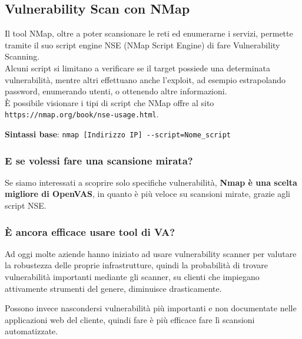 \documentclass{article}
\begin{document}
\subsection{Vulnerability Scan con NMap}
Il tool NMap, oltre a poter scansionare le reti ed enumerarne i servizi, permette tramite il suo script engine NSE (NMap Script Engine) di fare Vulnerability Scanning.\\
Alcuni script si limitano a verificare se il target possiede una determinata vulnerabilità, mentre altri effettuano anche l’exploit, ad esempio estrapolando password, enumerando utenti, o ottenendo altre informazioni.\\ È possibile visionare i tipi di script che NMap offre al sito \verb|https://nmap.org/book/nse-usage.html|.

\textbf{Sintassi base}: \verb|nmap [Indirizzo IP] --script=Nome_script| 

\subsubsection{E se volessi fare una scansione mirata?}
Se siamo interessati a scoprire solo specifiche vulnerabilità, \textbf{Nmap è una scelta migliore di OpenVAS}, in quanto è più veloce su scansioni mirate, grazie agli script NSE.

\subsubsection{È ancora efficace usare tool di VA?}
Ad oggi molte aziende hanno iniziato ad usare vulnerability scanner per valutare la robustezza delle proprie infrastrutture, quindi la probabilità di trovare vulnerabilità importanti mediante gli scanner, su clienti che impiegano attivamente strumenti del genere, diminuisce drasticamente.

Possono invece nascondersi vulnerabilità più importanti e non documentate nelle applicazioni web del cliente, quindi fare è più efficace fare lì scansioni automatizzate.

\newpage
\end{document}
